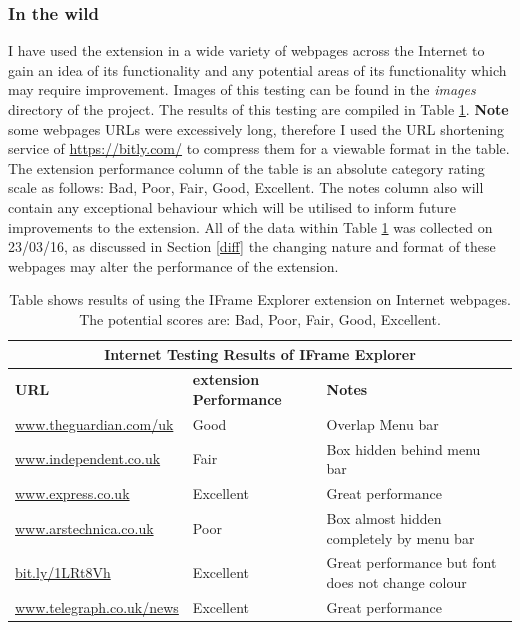 \documentclass[12pt]{article}
\begin{document}
\subsubsection{In the wild} \label{ieWild}
I have used the extension in a wide variety of webpages across the Internet to gain an idea of its functionality and any potential areas of its functionality which may require improvement. Images of this testing can be found in the \textit{images} directory of the project. The results of this testing are compiled in Table \ref{table:2}. \textbf{Note} some webpages URLs were excessively long, therefore I used the URL shortening service of \url{https://bitly.com/} to compress them for a viewable format in the table. The extension performance column of the table is an absolute category rating scale as follows: Bad, Poor, Fair, Good, Excellent. The notes column also will contain any exceptional behaviour which will be utilised to inform future improvements to the extension. All of the data within Table \ref{table:2} was collected on 23/03/16, as discussed in Section \ref{diff} the changing nature and format of these webpages may alter the performance of the extension. \\

{
\begin{table} [H]
\centering
\begin{tabular}{ |p{5cm}|p{5cm}|p{5cm}|  }
\hline
\multicolumn{3}{|c|}{\textbf{Internet Testing Results of IFrame Explorer}} \\
\hline
\textbf{URL} & \textbf{extension Performance} & \textbf{Notes} \\
\hline
\url{www.theguardian.com/uk} & Good & Overlap Menu bar \\
\hline
\url{www.independent.co.uk} & Fair & Box hidden behind menu bar \\
\hline
\url{www.express.co.uk} & Excellent & Great performance \\
\hline
\url{www.arstechnica.co.uk} & Poor & Box almost hidden completely by menu bar  \\
\hline
\url{bit.ly/1LRt8Vh} & Excellent & Great performance but font does not change colour \\
\hline
\url{www.telegraph.co.uk/news} & Excellent & Great performance   \\
\hline
\end{tabular}
\caption{Table shows results of using the IFrame Explorer extension on Internet webpages. The potential scores are: Bad, Poor, Fair, Good, Excellent.}
\label{table:2}
\end{table}
}
\end{document}
